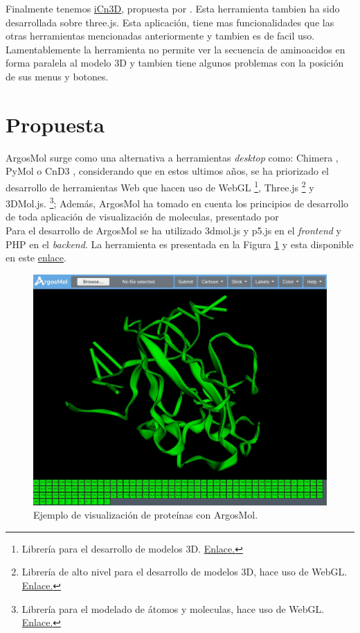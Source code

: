 \documentclass{article}
\begin{document}
Finalmente tenemos \href{https://www.ncbi.nlm.nih.gov/Structure/icn3d/full.html}{iCn3D}, propuesta por  \cite{wang2020icn3d}. Esta herramienta tambien ha sido desarrollada sobre three.js. Esta aplicación, tiene mas funcionalidades que las otras herramientas mencionadas anteriormente y tambien es de facil uso. Lamentablemente la herramienta no permite ver la secuencia de aminoacidos en forma paralela al modelo 3D y tambien tiene algunos problemas  con la posición de sus menus y botones.




\section{Propuesta}
	
ArgosMol surge como una alternativa a  herramientas \textit{desktop} como: Chimera \citep{pettersen2004ucsf}, PyMol \citep{pymol2017pymol} o CnD3 \citep{wang2000cn3d}, considerando que en estos ultimos años, se ha priorizado el desarrollo de herramientas Web que hacen uso de WebGL \footnote{Librería para el desarrollo de modelos 3D. \href{https://get.webgl.org/}{Enlace.}}, 		
Three.js \footnote{Librería de alto nivel para el desarrollo de modelos 3D, hace uso de WebGL. \href{https://threejs.org/}{Enlace.}} y 		
3DMol.js. \footnote{Librería para el modelado de átomos y moleculas, hace uso de WebGL. \href{https://threejs.org/}{Enlace.}}; Además, ArgosMol ha tomado en cuenta los principios de desarrollo de toda aplicación de visualización de moleculas, presentado por \cite{youkharibache2017twelve} \\

Para el desarrollo de ArgosMol se ha utilizado 3dmol.js y p5.js en el \textit{frontend} y PHP en el \textit{backend}. La herramienta es presentada en la Figura \ref{fig:argos1} y esta disponible en este \href{http://134.209.44.160/argosmol/protein_interaction.php}{enlace}. \\

\begin{figure}[H]
	\centering
	\includegraphics[width=\textwidth]{img/argosmol/mol1}
	\caption{ Ejemplo de visualización de proteínas con ArgosMol. }
	\label{fig:argos1}
\end{figure}
\end{document}

